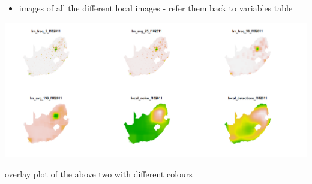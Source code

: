 \documentclass[11pt,preprint, authoryear]{elsarticle}
\let\origfigure\figure
\let\endorigfigure\endfigure
\renewenvironment{figure}[1][2] {
    \expandafter\origfigure\expandafter[H]
} {
    \endorigfigure
}
\numberwithin{equation}{section}
\numberwithin{figure}{section}
\numberwithin{table}{section}
\def\tightlist{} %
\begin{document}
\begin{itemize}
\tightlist
\item
  images of all the different local images - refer them back to
  variables table
\end{itemize}

\begin{figure}[H]
\includegraphics[width=1\linewidth]{figures/local_inputs} \caption{\label{local_images} Local Image Inputs}\label{fig:local_images}
\end{figure}

overlay plot of the above two with different colours


\end{document}
